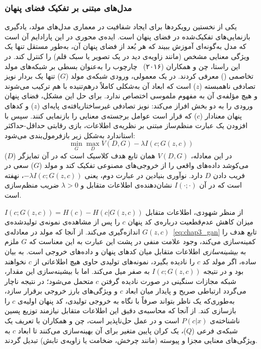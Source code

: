 \subsubsection{مدل‌های مبتنی بر تفکیک فضای پنهان}\label{sec:3-1-1-2}

یکی از نخستین رویکردها برای ایجاد شفافیت در معماری مدل‌های مولد، یادگیری بازنمایی‌های تفکیک‌شده در فضای پنهان است. ایده‌ی محوری در این پارادایم آن است که مدل به‌گونه‌ای آموزش ببیند که هر بُعد از فضای پنهان آن، به‌طور مستقل تنها یک ویژگی معنایی مشخص (مانند زاویه‌ی دید در یک تصویر یا سبک قلم) را کنترل کند. در این راستا، چن و همکاران (۲۰۱۶)~\cite{chen2016infogan} چارچوب  را به‌عنوان بسطی بر شبکه‌های مولد تخاصمی () معرفی کردند. در یک  معمولی، ورودی شبکه‌ی مولد ($G$) تنها یک بردار نویز تصادفی ناهمبسته ($z$) است که ابعاد آن به‌شکلی کاملاً درهم‌تنیده با هم ترکیب می‌شوند و هیچ مؤلفه‌ی آن به مفهوم ملموسی اختصاص ندارد. برای حل این مشکل،  فضای پنهان ورودی را به دو بخش افراز می‌کند: نویز تصادفی غیرساختاریافته‌ی پایه‌ای ($z$) و کدهای پنهان معنادار ($c$) که قرار است عوامل برجسته‌ی معنایی را بازنمایی کنند. سپس با افزودن یک عبارت منظم‌ساز مبتنی بر نظریه‌ی اطلاعات، بازی رقابتی حداقل-حداکثر استاندارد به‌شکل زیر بازفرمول‌بندی می‌شود:
\begin{equation}\label{eq:chap3_gan}
    \min_G \max_D V(D, G) - \lambda I(c; G(z, c))
\end{equation}
در این معادله، $V(D, G)$ همان تابع هدف کلاسیک  است که در آن تمایزگر ($D$) می‌کوشد داده‌های واقعی را از خروجی‌های مصنوعی تفکیک کند و مولد ($G$) سعی در فریب دادن $D$ دارد. نوآوری بنیادین در عبارت دوم، یعنی $-\lambda I(c; G(z, c))$، نهفته است که در آن $I(\cdot ; \cdot)$ نشان‌دهنده‌ی اطلاعات متقابل و $\lambda > 0$ ضریب منظم‌سازی است. 

از منظر شهودی، اطلاعات متقابل $I(c; G(z, c)) = H(c) - H(c | G(z, c))$ میزان کاهش عدم‌قطعیت درباره‌ی کد پنهان $c$ را پس از مشاهده‌ی نمونه‌ی تولیدشده‌ی $G(z, c)$ اندازه‌گیری می‌کند. از آنجا که مولد در معادله‌ی~\ref{eq:chap3_gan} تابع هدف را کمینه‌سازی می‌کند، وجود علامت منفی در پشت این عبارت به این معناست که $G$ ملزم به \textit{بیشینه‌سازی} اطلاعات متقابل میان کدهای پنهان و داده‌های خروجی است. به بیان ساده، اگر مولد کد $c$ را نادیده بگیرد، نمونه‌های تولیدی حاوی هیچ اطلاعاتی از $c$ نخواهند بود و در نتیجه $I(c; G(z, c))$ به صفر میل می‌کند. اما با بیشینه‌سازی این مقدار، شبکه مجازات سنگینی در صورت نادیده گرفتن $c$ متحمل می‌شود؛ در نتیجه ناچار می‌گردد ارتباطی صریح و پایدار میان ابعاد $c$ و ویژگی‌های بارز خروجی برقرار سازد، به‌طوری‌که یک ناظر بتواند صرفاً با نگاه به خروجی تولیدی، کد پنهان اولیه‌ی $c$ را بازسازی کند. از آنجا که محاسبه‌ی دقیق این اطلاعات متقابل نیازمند توزیع پسین ناشناخته‌ی $P(c|x)$ است و در عمل حل‌ناپذیر است، چن و همکاران با تعریف یک شبکه‌ی فرعی ($Q$)، یک کران پایین متغیر برای آن بهینه‌سازی می‌کنند تا ابعاد $c$ به ویژگی‌های معنایی مجزا و پیوسته (مانند چرخش، ضخامت یا زاویه‌ی تابش) تبدیل گردند.

